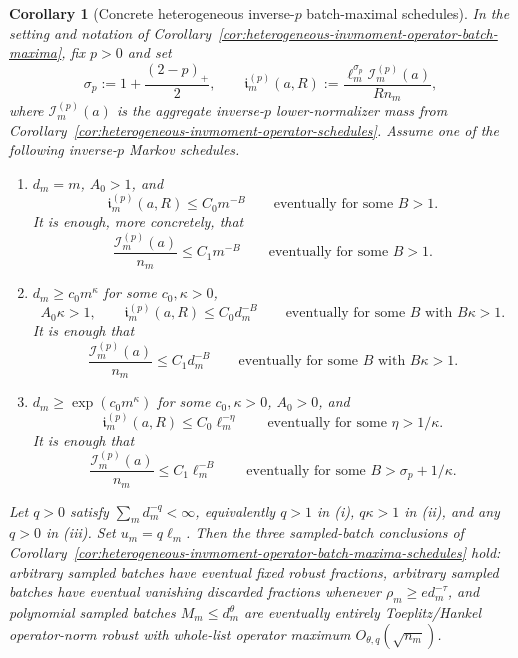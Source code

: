 \documentclass[11pt]{amsart}
\numberwithin{equation}{section}
\newtheorem{corollary}[theorem]{Corollary}
\theoremstyle{definition}
\theoremstyle{remark}
\begin{document}
\begin{corollary}[Concrete heterogeneous inverse-\(p\) batch-maximal schedules]
\label{cor:heterogeneous-invp-operator-batch-maxima-schedules}
In the setting and notation of
Corollary~\ref{cor:heterogeneous-invmoment-operator-batch-maxima}, fix
\(p>0\) and set
\[
  \sigma_p:=1+\frac{(2-p)_+}{2},
  \qquad
  \mathfrak i_m^{(p)}(a,R):=
  \frac{\ell_m^{\sigma_p}\mathcal I_m^{(p)}(a)}{R n_m},
\]
where \(\mathcal I_m^{(p)}(a)\) is the aggregate inverse-\(p\) lower-normalizer
mass from Corollary~\ref{cor:heterogeneous-invmoment-operator-schedules}.
Assume one of the following inverse-\(p\) Markov schedules.
\begin{enumerate}[label=\textup{(\roman*)},leftmargin=2.2em]
\item \(d_m=m\), \(A_0>1\), and
\[
  \mathfrak i_m^{(p)}(a,R)\le C_0m^{-B}
  \qquad\text{eventually for some }B>1.
\]
It is enough, more concretely, that
\[
  \frac{\mathcal I_m^{(p)}(a)}{n_m}\le C_1m^{-B}
  \qquad\text{eventually for some }B>1.
\]
\item \(d_m\ge c_0m^\kappa\) for some \(c_0,\kappa>0\),
\[
  A_0\kappa>1,
  \qquad
  \mathfrak i_m^{(p)}(a,R)\le C_0d_m^{-B}
  \qquad\text{eventually for some }B\text{ with }B\kappa>1.
\]
It is enough that
\[
  \frac{\mathcal I_m^{(p)}(a)}{n_m}\le C_1d_m^{-B}
  \qquad\text{eventually for some }B\text{ with }B\kappa>1.
\]
\item \(d_m\ge\exp(c_0m^\kappa)\) for some \(c_0,\kappa>0\), \(A_0>0\), and
\[
  \mathfrak i_m^{(p)}(a,R)\le C_0\ell_m^{-\eta}
  \qquad\text{eventually for some }\eta>1/\kappa .
\]
It is enough that
\[
  \frac{\mathcal I_m^{(p)}(a)}{n_m}\le C_1\ell_m^{-B}
  \qquad\text{eventually for some }B>\sigma_p+1/\kappa .
\]
\end{enumerate}
Let \(q>0\) satisfy \(\sum_m d_m^{-q}<\infty\), equivalently \(q>1\) in
\textup{(i)}, \(q\kappa>1\) in \textup{(ii)}, and any \(q>0\) in
\textup{(iii)}.  Set \(u_m=q\ell_m\).  Then the three sampled-batch conclusions
of Corollary~\ref{cor:heterogeneous-invmoment-operator-batch-maxima-schedules}
hold: arbitrary sampled batches have eventual fixed robust fractions, arbitrary
sampled batches have eventual vanishing discarded fractions whenever
\(\rho_m\ge e d_m^{-\tau}\), and polynomial sampled batches
\(M_m\le d_m^\theta\) are eventually entirely Toeplitz/Hankel operator-norm
robust with whole-list operator maximum \(O_{\theta,q}(\sqrt{n_m})\).
\end{corollary}
\end{document}
